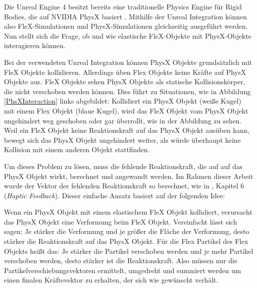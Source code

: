 Die Unreal Engine 4 besitzt bereits eine traditionelle Physics Engine für Rigid Bodies, die auf NVIDIA PhysX basiert \cite{ue4physics}. Mithilfe der Unreal Integration können also  FleX-Simulationen und PhysX-Simulationen gleichzeitig ausgeführt werden. Nun stellt sich die Frage, ob und wie elastische  FleX-Objekte mit PhysX-Objekte interagieren können.

Bei der verwendeten Unreal Integration können PhysX Objekte grundsätzlich mit FleX Objekte kollidieren. Allerdings üben Flex Objekte keine Kräfte auf PhysX Objekte aus. FleX Objekte sehen PhysX Objekte als statische Kollisionskörper, die nicht verschoben werden können. Dies führt zu Situationen, wie in Abbildung \ref{PhsXInteraction} links abgebildet: Kollidiert ein PhysX Objekt (weiße Kugel) mit einem Flex Objekt (blaue Kugel), wird das FleX Objekt vom PhysX Objekt ungehindert weg geschoben oder gar überrollt, wie in der Abbildung zu sehen. Weil ein FleX Objekt keine Reaktionskraft auf das PhysX Objekt ausüben kann, bewegt sich das PhysX Objekt ungehindert weiter, als würde überhaupt keine Kollision mit einem anderen Objekt stattfinden.


Um dieses Problem zu lösen, muss die fehlende Reaktionskraft, die auf auf das PhysX Objekt wirkt, berechnet und angewandt werden. 
Im Rahmen dieser Arbeit wurde der Vektor der fehlenden Reaktionskraft so berechnet, wie in \cite{VRSim20}, Kapitel 6 (\textit{Haptic Feedback}). Dieser einfache Ansatz basiert auf der folgenden Idee: 

Wenn ein PhysX Objekt mit einem elastischem FleX Objekt kollidiert, verursacht das PhysX Objekt eine Verformung beim FleX Objekt. Vereinfacht lässt sich sagen: Je stärker die Verformung und je größer die Fläche der Verformung, desto stärker die Reaktionskraft auf das PhysX Objekt. Für die Flex Partikel des Flex Objekts heißt das: Je stärker die Partikel verschoben werden und je mehr Partikel verschoben werden, desto stärker ist die Reaktionskraft. Also müssen nur die Partikelverschiebungsvektoren ermittelt, umgedreht und summiert werden um einen finalen Kräftevektor zu erhalten, der sich wie gewünscht verhält. 

